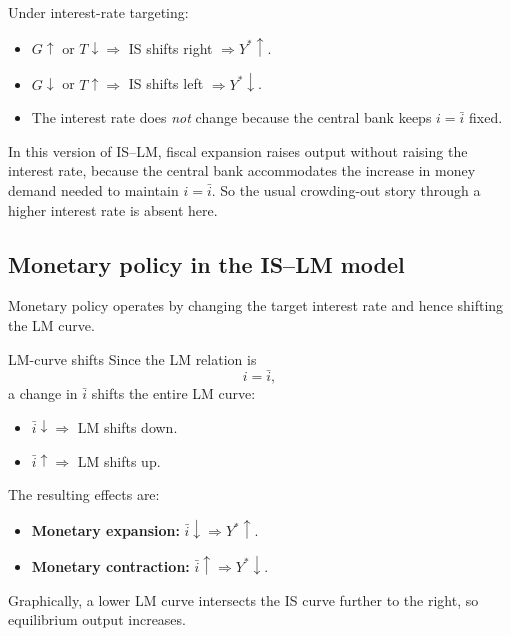 \noindent
Under interest-rate targeting:
\begin{itemize}[leftmargin=1.5em]
\item $G\uparrow$ or $T\downarrow \Rightarrow$ IS shifts right $\Rightarrow Y^\ast\uparrow$.
\item $G\downarrow$ or $T\uparrow \Rightarrow$ IS shifts left $\Rightarrow Y^\ast\downarrow$.
\item The interest rate does \emph{not} change because the central bank keeps $i=\bar{i}$ fixed.
\end{itemize}

\begin{examtip}[title={Exam Focus: Fiscal policy when LM is horizontal}]
In this version of IS--LM, fiscal expansion raises output without raising the interest rate, because the central bank accommodates the increase in money demand needed to maintain $i=\bar{i}$. So the usual crowding-out story through a higher interest rate is absent here.
\end{examtip}

\subsection{Monetary policy in the IS--LM model}

Monetary policy operates by changing the target interest rate and hence shifting the LM curve.

\begin{definition}{LM-curve shifts}{}
Since the LM relation is
\[
i=\bar{i},
\]
a change in $\bar{i}$ shifts the entire LM curve:
\begin{itemize}[leftmargin=1.5em]
\item $\bar{i}\downarrow \Rightarrow$ LM shifts down.
\item $\bar{i}\uparrow \Rightarrow$ LM shifts up.
\end{itemize}
\end{definition}

\noindent
The resulting effects are:
\begin{itemize}[leftmargin=1.5em]
\item \textbf{Monetary expansion:} $\bar{i}\downarrow \Rightarrow Y^\ast\uparrow$.
\item \textbf{Monetary contraction:} $\bar{i}\uparrow \Rightarrow Y^\ast\downarrow$.
\end{itemize}

\noindent
Graphically, a lower LM curve intersects the IS curve further to the right, so equilibrium output increases.


